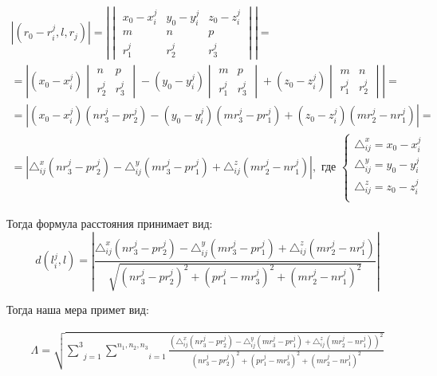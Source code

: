$$\begin{gathered}
	|(r_0 - r_i^j, \mathit{l}, r_j)| = 
	\left| \begin{vmatrix}
		x_0 - x_i^j & y_0 - y_i^j & z_0 - z_i^j \\
		m & n & p \\
		r_1^j & r_2^j & r_3^j 
	\end{vmatrix} \right|= \\
	= \left| (x_0 - x_i^j) \begin{vmatrix}
		n & p \\
		r_2^j & r_3^j 
	\end{vmatrix} - (y_0 - y_i^j) \begin{vmatrix}
		m & p \\
		r_1^j & r_3^j
	\end{vmatrix} + (z_0 - z_i^j) \begin{vmatrix}
		m & n \\
		r_1^j & r_2^j
	\end{vmatrix} \right| = \\
	= \left| (x_0 - x_i^j)(n r_3^j - p r_2^j) - (y_0 - y_i^j)(m r_3^j - p r_1^j) + (z_0 - z_i^j)(m r_2^j - n r_1^j) \right| = \\
	= \left| \triangle_{ij}^x (n r_3^j - p r_2^j) - \triangle_{ij}^y (m r_3^j - p r_1^j) + \triangle_{ij}^z (m r_2^j - n r_1^j) \right|, \text{ где } \begin{cases}
		\triangle_{ij}^x = x_0 - x_i^j \\
		\triangle_{ij}^y = y_0 - y_i^j \\
		\triangle_{ij}^z = z_0 - z_i^j \\
	\end{cases}
\end{gathered}$$

Тогда формула расстояния принимает вид:
$$d (l_i^j, \mathit{l}) = \left| \frac{\triangle_{ij}^x (n r_3^j - p r_2^j) - \triangle_{ij}^y (m r_3^j - p r_1^j) + \triangle_{ij}^z (m r_2^j - n r_1^j)}{\sqrt{ (n r_3^j - p r_2^j)^2 + (p r_1^j - m r_3^j)^2 + (m r_2^j - n r_1^j)^2}} \right|$$

Тогда наша мера примет вид:

$$\begin{gathered}
	\Lambda = \sqrt{ 
	\underset{j=1}{\overset{3}{\sum}} 
	\underset{i=1}{\overset{n_1, n_2, n_3}{\sum}}
		\frac{\left(\triangle_{ij}^x (n r_3^j - p r_2^j) - \triangle_{ij}^y (m r_3^j - p r_1^j) + \triangle_{ij}^z (m r_2^j - n r_1^j)\right)^2}{(n r_3^j - p r_2^j)^2 + (p r_1^j - m r_3^j)^2 + (m r_2^j - n r_1^j)^2}
	 } 
\end{gathered}$$

